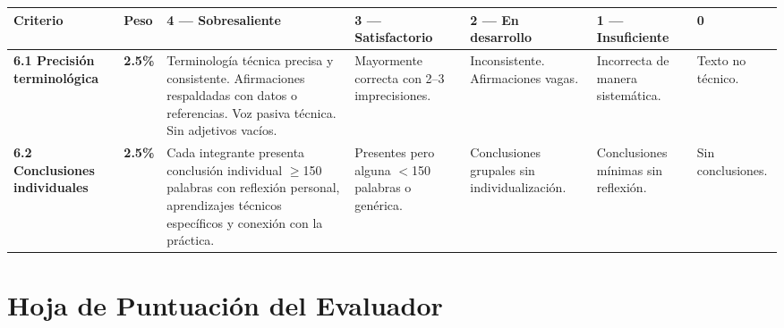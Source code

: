\documentclass[11pt,a4paper,landscape]{article}
\begin{document}
	\begin{center}
		\footnotesize
		\begin{tabular}{|P{2.2cm}|C{1cm}|L{8.2cm}|L{3.8cm}|L{3.8cm}|L{3cm}|L{2cm}|}
			\hline
			\color{white}\textbf{Criterio} & \color{white}\textbf{Peso} &
			\color{white}\textbf{4 --- Sobresaliente} &
			\color{white}\textbf{3 --- Satisfactorio} &
			\color{white}\textbf{2 --- En desarrollo} &
			\color{white}\textbf{1 --- Insuficiente} &
			\color{white}\textbf{0}\\
			\hline
			
			\textbf{6.1 Precisi\'on terminol\'ogica} &
			\textbf{2.5\%} &
			Terminolog\'ia t\'ecnica precisa y consistente. Afirmaciones respaldadas con datos o referencias. Voz pasiva t\'ecnica. Sin adjetivos vac\'ios. &
			Mayormente correcta con 2--3 imprecisiones. &
			Inconsistente. Afirmaciones vagas. &
			Incorrecta de manera sistem\'atica. &
			Texto no t\'ecnico.\\
			\hline
			
			\textbf{6.2 Conclusiones individuales} &
			\textbf{2.5\%} &
			Cada integrante presenta conclusi\'on individual $\geq$150 palabras con reflexi\'on personal, aprendizajes t\'ecnicos espec\'ificos y conexi\'on con la pr\'actica. &
			Presentes pero alguna $<$150 palabras o gen\'erica. &
			Conclusiones grupales sin individualizaci\'on. &
			Conclusiones m\'inimas sin reflexi\'on. &
			Sin conclusiones.\\
			\hline
		\end{tabular}
	\end{center}
	
	\newpage
	
	\section{Hoja de Puntuaci\'on del Evaluador}
	
\end{document}

